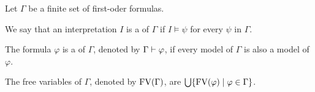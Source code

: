 \begin{definition} %
	Let $\Gamma$ be a finite set of first-oder formulas.
	\begin{description}
		\item We say that an interpretation $I$ is a  of $\Gamma$ if $I\models\psi$ for every $\psi$ in $\Gamma$.
		\item The formula $\varphi$ is a  of $\Gamma$, denoted by $\Gamma\vdash\varphi$, if every model of $\Gamma$ is also a model of $\varphi$.
		\item The free variables of $\Gamma$, denoted by $\text{FV}(\Gamma)$, are $\bigcup\{\text{FV}(\varphi)\mid \varphi\in \Gamma\}$.
	\end{description}
\end{definition}

